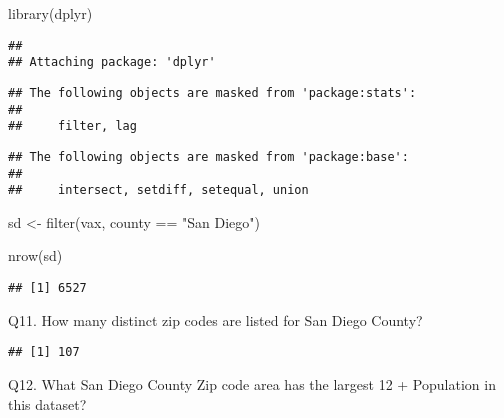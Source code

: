 \documentclass[
]{article}
\newenvironment{Shaded}{\begin{snugshade}}{\end{snugshade}}
\newcommand{\FunctionTok}[1]{\textcolor[rgb]{0.00,0.00,0.00}{#1}}
\newcommand{\NormalTok}[1]{#1}
\newcommand{\OtherTok}[1]{\textcolor[rgb]{0.56,0.35,0.01}{#1}}
\newcommand{\SpecialCharTok}[1]{\textcolor[rgb]{0.00,0.00,0.00}{#1}}
\newcommand{\StringTok}[1]{\textcolor[rgb]{0.31,0.60,0.02}{#1}}
\begin{document}
\begin{Shaded}
\begin{Highlighting}[]
\FunctionTok{library}\NormalTok{(dplyr)}
\end{Highlighting}
\end{Shaded}

\begin{verbatim}
## 
## Attaching package: 'dplyr'
\end{verbatim}

\begin{verbatim}
## The following objects are masked from 'package:stats':
## 
##     filter, lag
\end{verbatim}

\begin{verbatim}
## The following objects are masked from 'package:base':
## 
##     intersect, setdiff, setequal, union
\end{verbatim}

\begin{Shaded}
\begin{Highlighting}[]
\NormalTok{sd }\OtherTok{\textless{}{-}} \FunctionTok{filter}\NormalTok{(vax, county }\SpecialCharTok{==} \StringTok{"San Diego"}\NormalTok{)}

\FunctionTok{nrow}\NormalTok{(sd)}
\end{Highlighting}
\end{Shaded}

\begin{verbatim}
## [1] 6527
\end{verbatim}

Q11. How many distinct zip codes are listed for San Diego County?

\begin{Shaded}
\end{Shaded}

\begin{verbatim}
## [1] 107
\end{verbatim}

Q12. What San Diego County Zip code area has the largest 12 + Population
in this dataset?

\begin{Shaded}
\end{Shaded}
\end{document}
